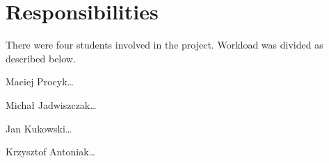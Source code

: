 \chapter{Responsibilities}
\label{chap:responsibilities}


There were four students involved in the project.
Workload was divided as described below.

Maciej Procyk\dots

Michał Jadwiszczak\dots

Jan Kukowski\dots

Krzysztof Antoniak\dots
